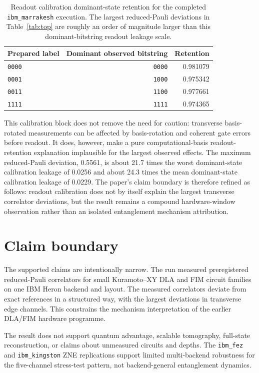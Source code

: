 \documentclass[preprint,aps,physrev,superscriptaddress,floatfix,longbibliography]{revtex4-2}
\begin{document}
\begin{table}[tb]
\centering
\small
\begin{tabular}{lrr}
\toprule
Prepared label & Dominant observed bitstring & Retention \\
\midrule
\texttt{0000} & \texttt{0000} & 0.981079 \\
\texttt{0001} & \texttt{1000} & 0.975342 \\
\texttt{0011} & \texttt{1100} & 0.977661 \\
\texttt{1111} & \texttt{1111} & 0.974365 \\
\bottomrule
\end{tabular}
\caption{Readout calibration dominant-state retention for the completed
\texttt{ibm\_marrakesh} execution. The largest reduced-Pauli deviations in
Table~\ref{tab:top} are roughly an order of magnitude larger than this
dominant-bitstring readout leakage scale.}
\label{tab:readout}
\end{table}

This calibration block does not remove the need for caution: transverse
basis-rotated measurements can be affected by basis-rotation and coherent gate
errors before readout. It does, however, make a pure computational-basis
readout-retention explanation implausible for the largest observed effects.
The maximum reduced-Pauli deviation, 0.5561, is about 21.7 times the worst
dominant-state calibration leakage of 0.0256 and about 24.3 times the mean
dominant-state calibration leakage of 0.0229. The paper's claim boundary is
therefore refined as follows: readout calibration does not by itself explain
the largest transverse correlator deviations, but the result remains a
compound hardware-window observation rather than an isolated entanglement
mechanism attribution.

\section{Claim boundary}

The supported claims are intentionally narrow. The run measured preregistered
reduced-Pauli correlators for small Kuramoto--XY DLA and FIM circuit families
on one IBM Heron backend and layout. The measured correlators deviate from
exact references in a structured way, with the largest deviations in
transverse edge channels. This constrains the mechanism interpretation of the
earlier DLA/FIM hardware programme.

The result does not support quantum advantage, scalable tomography, full-state
reconstruction, or claims about unmeasured circuits and depths. The
\texttt{ibm\_fez} and \texttt{ibm\_kingston} ZNE replications support limited
multi-backend robustness for the five-channel stress-test pattern, not
backend-general entanglement dynamics.
\end{document}
